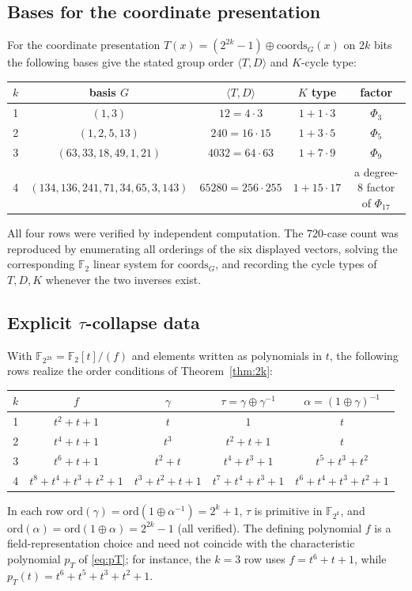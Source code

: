 \documentclass[11pt]{article}
\begin{document}
\subsection*{Bases for the coordinate presentation}
For the coordinate presentation $T(x)=(2^{2k}-1)\oplus\mathrm{coords}_G(x)$ on
$2k$ bits the following bases give the stated group order $\langle T,D\rangle$ and
$K$-cycle type:
\begin{center}
\begin{tabular}{c|c|c|c|c}
$k$ & basis $G$ & $\langle T,D\rangle$ & $K$ type & factor \\
\hline
1 & $(1,3)$ & $12=4\cdot3$ & $1+1\cdot3$ & $\Phi_3$ \\
2 & $(1,2,5,13)$ & $240=16\cdot15$ & $1+3\cdot5$ & $\Phi_5$ \\
3 & $(63,33,18,49,1,21)$ & $4032=64\cdot63$ & $1+7\cdot9$ & $\Phi_9$ \\
4 & $(134,136,241,71,34,65,3,143)$ & $65280=256\cdot255$ & $1+15\cdot17$ & a degree-$8$ factor of $\Phi_{17}$ \\
\end{tabular}
\end{center}
All four rows were verified by independent computation. The $720$-case count
was reproduced by enumerating all orderings of the six displayed vectors, solving
the corresponding $\mathbb{F}_2$ linear system for $\mathrm{coords}_G$, and
recording the cycle types of $T,D,K$ whenever the two inverses exist.

\begin{samepage}
\subsection*{Explicit $\tau$-collapse data}
With $\mathbb{F}_{2^{2k}}=\mathbb{F}_2[t]/(f)$ and elements written as polynomials in $t$,
the following rows realize the order conditions of Theorem~\ref{thm:2k}:
\begin{center}
\begin{tabular}{c|c|c|c|c}
$k$ & $f$ & $\gamma$ & $\tau=\gamma\oplus\gamma^{-1}$ & $\alpha=(1\oplus\gamma)^{-1}$ \\
\hline
1 & $t^2+t+1$ & $t$ & $1$ & $t$ \\
2 & $t^4+t+1$ & $t^3$ & $t^2+t+1$ & $t$ \\
3 & $t^6+t+1$ & $t^2+t$ & $t^4+t^3+1$ & $t^5+t^3+t^2$ \\
4 & $t^8+t^4+t^3+t^2+1$ & $t^3+t^2+t+1$ & $t^7+t^4+t^3+1$ & $t^6+t^4+t^3+t^2+1$ \\
\end{tabular}
\end{center}
\end{samepage}
In each row $\mathrm{ord}(\gamma)=\mathrm{ord}(1\oplus\alpha^{-1})=2^k+1$, $\tau$ is
primitive in $\mathbb{F}_{2^k}$, and
$\mathrm{ord}(\alpha)=\mathrm{ord}(1\oplus\alpha)=2^{2k}-1$ (all verified). The defining polynomial $f$ is a field-representation choice and need not coincide with the characteristic polynomial $p_T$ of \eqref{eq:pT}; for instance, the $k=3$ row uses $f=t^6+t+1$, while $p_T(t)=t^6+t^5+t^3+t^2+1$.
\end{document}

